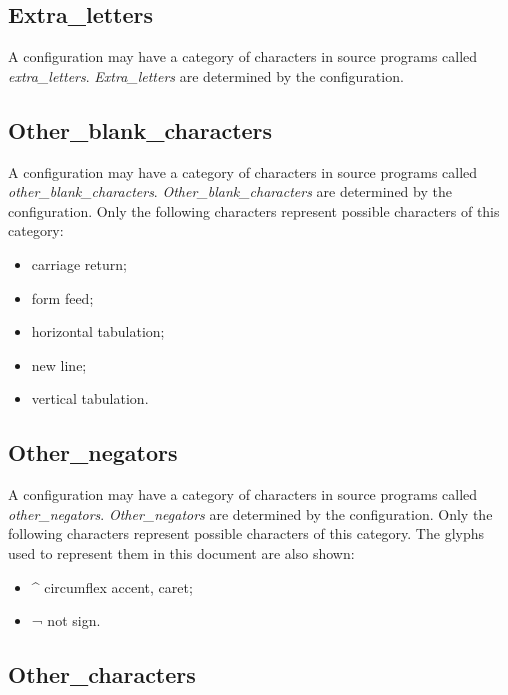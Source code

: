 \subsection{Extra\_letters}\label{extra_letters}

A configuration may have a category of characters in source programs
called \emph{extra\_letters}. \emph{Extra\_letters} are determined by
the configuration.

\subsection{Other\_blank\_characters}\label{other_blank_characters}

A configuration may have a category of characters in source programs
called \emph{other\_blank\_characters}. \emph{Other\_blank\_characters}
are determined by the configuration. Only the following characters
represent possible characters of this category:

\begin{itemize}
\tightlist
\item
  carriage return;
\item
  form feed;
\item
  horizontal tabulation;
\item
  new line;
\item
  vertical tabulation.
\end{itemize}

\subsection{Other\_negators}\label{other_negators}

A configuration may have a category of characters in source programs
called \emph{other\_negators}. \emph{Other\_negators} are determined by
the configuration. Only the following characters represent possible
characters of this category. The glyphs used to represent them in this
document are also shown:

\begin{itemize}
\tightlist
\item
  \^{} circumflex accent, caret;
\item
  ¬ not sign.
\end{itemize}

\subsection{Other\_characters}\label{other_characters}


